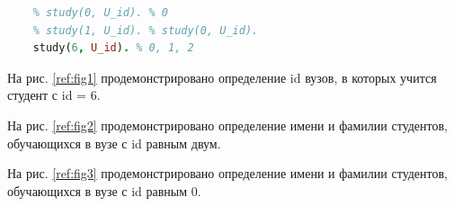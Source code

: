 \documentclass[a4paper,oneside,12pt]{extreport}
\begin{document}
\begin{task}
\begin{lstlisting}[language=Prolog]
    % All universities where the student studies.
    % study(0, U_id). % 0
    % study(1, U_id). % study(0, U_id). 
    study(6, U_id). % 0, 1, 2
    \end{lstlisting}

    На рис. \ref{ref:fig1} продемонстрировано определение id вузов, 
    в которых учится студент с id = 6.

    \begin{figure}[ht!]
    \end{figure}

    На рис. \ref{ref:fig2} продемонстрировано определение имени и фамилии студентов,
    обучающихся в вузе с id равным двум. 


    \begin{figure}[ht!]
    \end{figure}

    На рис. \ref{ref:fig3} продемонстрировано определение имени и фамилии студентов,
    обучающихся в вузе с id равным 0. 


    \begin{figure}[ht!]
    \end{figure}


\end{task}
\end{document}
